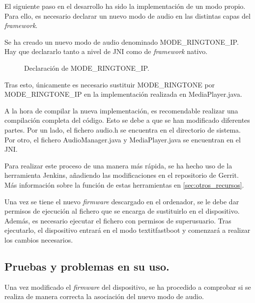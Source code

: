 El siguiente paso en el desarrollo ha sido la implementación de un modo propio. Para ello, es necesario declarar un nuevo modo de audio en las distintas capas del \textit{framework}.

Se ha creado un nuevo modo de audio denominado MODE\_RINGTONE\_IP. Hay que declararlo tanto a nivel de \gls{JNI} como de \textit{framework} nativo.

\begin{figure}[H]
	\centering
	\caption{Declaración de MODE\_RINGTONE\_IP.} \label{fig:mode_ringtone_ip}
\end{figure}

Tras esto, únicamente es necesario sustituir MODE\_RINGTONE por \\ MODE\_RINGTONE\_IP en la implementación realizada en MediaPlayer.java.

A la hora de compilar la nueva implementación, es recomendable realizar una compilación completa del código. Esto se debe a que se han modificado diferentes partes. Por un lado, el fichero audio.h se encuentra en el directorio de sistema. Por otro, el fichero AudioManager.java y MediaPlayer.java se encuentran en el \gls{JNI}.

Para realizar este proceso de una manera más rápida, se ha hecho uso de la herramienta Jenkins, añadiendo las modificaciones en el repositorio de Gerrit. Más información sobre la función de estas herramientas en \ref{sec:otros_recursos}.

Una vez se tiene el nuevo \textit{firmware} descargado en el ordenador, se le debe dar permisos de ejecución al fichero que se encarga de sustituirlo en el dispositivo. Además, es necesario ejecutar el fichero con permisos de superusuario. Tras ejecutarlo, el dispositivo entrará en el modo textit{fastboot} y comenzará a realizar los cambios necesarios.
 
\subsection{Pruebas y problemas en su uso.}
Una vez modificado el \textit{firmware} del dispositivo, se ha procedido a comprobar si se realiza de manera correcta la asociación del nuevo modo de audio.

